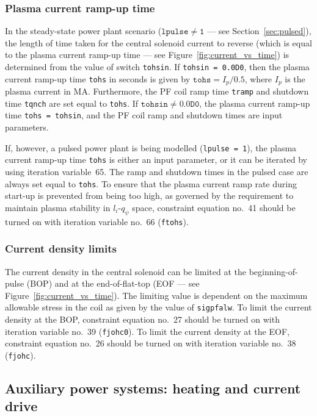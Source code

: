\documentclass[11pt,a4paper]{report}
\begin{document}
\subsubsection{Plasma current ramp-up time}
\label{sec:tohs}

In the steady-state power plant scenario ($\mathtt{lpulse \not= 1}$ --- see
Section~\ref{sec:pulsed}), the length of time taken for the central solenoid
current to reverse (which is equal to the plasma current ramp-up time --- see
Figure~\ref{fig:current_vs_time}) is determined from the value of switch
\texttt{tohsin}. If \texttt{tohsin = 0.0D0}, then the plasma current ramp-up
time \texttt{tohs} in seconds is given by $\mathtt{tohs} = I_p / 0.5$, where
$I_p$ is the plasma current in MA\@. Furthermore, the PF coil ramp time
\texttt{tramp} and shutdown time \texttt{tqnch} are set equal to
\texttt{tohs}.  If $\mathtt{tohsin \not= 0.0D0}$, the plasma current ramp-up
time \texttt{tohs = tohsin}, and the PF coil ramp and shutdown times are input
parameters.

If, however, a pulsed power plant is being modelled (\texttt{lpulse = 1}), the
plasma current ramp-up time \texttt{tohs} is either an input parameter, or it can be
iterated by using iteration variable~65. The ramp and shutdown times in the
pulsed case are always set equal to \texttt{tohs}. To ensure that the plasma
current ramp rate during start-up is prevented from being too high, as
governed by the requirement to maintain plasma stability in $l_i$-$q_\psi$
space, constraint equation no.\ 41 should be turned on with iteration variable
no.\ 66 (\texttt{ftohs}).

\subsubsection{Current density limits}

The current density in the central solenoid can be limited at the
beginning-of-pulse (BOP) and at the end-of-flat-top (EOF --- see
Figure~\ref{fig:current_vs_time}). The limiting value is dependent on the
maximum allowable stress in the coil as given by the value of
\texttt{sigpfalw}. To limit the current density at the BOP, constraint
equation no.\ 27 should be turned on with iteration variable no.\ 39
(\texttt{fjohc0}). To limit the current density at the EOF, constraint
equation no.\ 26 should be turned on with iteration variable no.\ 38
(\texttt{fjohc}).

\subsection{Auxiliary power systems: heating and current drive}
\label{sec:hcd}
\end{document}
